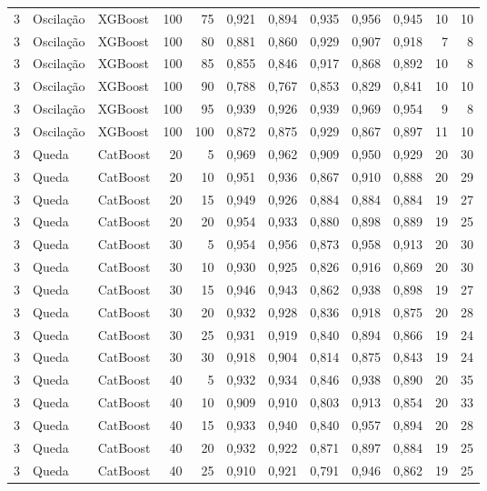 \begin{longtable}{@{}rllrrrrrrrrr@{}}
3 & Oscilação & XGBoost & 100 & 75 & 0,921 & 0,894 & 0,935 & 0,956 & 0,945 & 10 & 10 \\
3 & Oscilação & XGBoost & 100 & 80 & 0,881 & 0,860 & 0,929 & 0,907 & 0,918 & 7 & 8 \\
3 & Oscilação & XGBoost & 100 & 85 & 0,855 & 0,846 & 0,917 & 0,868 & 0,892 & 10 & 8 \\
3 & Oscilação & XGBoost & 100 & 90 & 0,788 & 0,767 & 0,853 & 0,829 & 0,841 & 10 & 10 \\
3 & Oscilação & XGBoost & 100 & 95 & 0,939 & 0,926 & 0,939 & 0,969 & 0,954 & 9 & 8 \\
3 & Oscilação & XGBoost & 100 & 100 & 0,872 & 0,875 & 0,929 & 0,867 & 0,897 & 11 & 10 \\
3 & Queda & CatBoost & 20 & 5 & 0,969 & 0,962 & 0,909 & 0,950 & 0,929 & 20 & 30 \\
3 & Queda & CatBoost & 20 & 10 & 0,951 & 0,936 & 0,867 & 0,910 & 0,888 & 20 & 29 \\
3 & Queda & CatBoost & 20 & 15 & 0,949 & 0,926 & 0,884 & 0,884 & 0,884 & 19 & 27 \\
3 & Queda & CatBoost & 20 & 20 & 0,954 & 0,933 & 0,880 & 0,898 & 0,889 & 19 & 25 \\
3 & Queda & CatBoost & 30 & 5 & 0,954 & 0,956 & 0,873 & 0,958 & 0,913 & 20 & 30 \\
3 & Queda & CatBoost & 30 & 10 & 0,930 & 0,925 & 0,826 & 0,916 & 0,869 & 20 & 30 \\
3 & Queda & CatBoost & 30 & 15 & 0,946 & 0,943 & 0,862 & 0,938 & 0,898 & 19 & 27 \\
3 & Queda & CatBoost & 30 & 20 & 0,932 & 0,928 & 0,836 & 0,918 & 0,875 & 20 & 28 \\
3 & Queda & CatBoost & 30 & 25 & 0,931 & 0,919 & 0,840 & 0,894 & 0,866 & 19 & 24 \\
3 & Queda & CatBoost & 30 & 30 & 0,918 & 0,904 & 0,814 & 0,875 & 0,843 & 19 & 24 \\
3 & Queda & CatBoost & 40 & 5 & 0,932 & 0,934 & 0,846 & 0,938 & 0,890 & 20 & 35 \\
3 & Queda & CatBoost & 40 & 10 & 0,909 & 0,910 & 0,803 & 0,913 & 0,854 & 20 & 33 \\
3 & Queda & CatBoost & 40 & 15 & 0,933 & 0,940 & 0,840 & 0,957 & 0,894 & 20 & 28 \\
3 & Queda & CatBoost & 40 & 20 & 0,932 & 0,922 & 0,871 & 0,897 & 0,884 & 19 & 25 \\
3 & Queda & CatBoost & 40 & 25 & 0,910 & 0,921 & 0,791 & 0,946 & 0,862 & 19 & 25 \\

\end{longtable}

